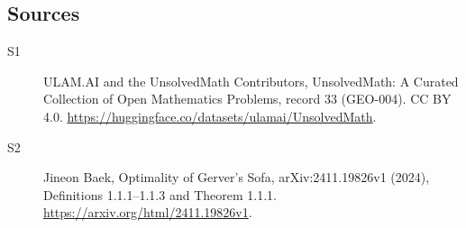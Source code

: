 \documentclass[11pt]{article}
\begin{document}
\subsection{Sources}
\begin{description}
\item[\hypertarget{source:33:1}{S1}] ULAM.AI and the UnsolvedMath Contributors, UnsolvedMath: A Curated Collection of Open Mathematics Problems, record 33 (GEO-004). CC BY 4.0. \url{https://huggingface.co/datasets/ulamai/UnsolvedMath}.
\item[\hypertarget{source:33:2}{S2}] Jineon Baek, Optimality of Gerver’s Sofa, arXiv:2411.19826v1 (2024), Definitions 1.1.1--1.1.3 and Theorem 1.1.1. \url{https://arxiv.org/html/2411.19826v1}.
\end{description}
\label{end:33}
\end{document}
